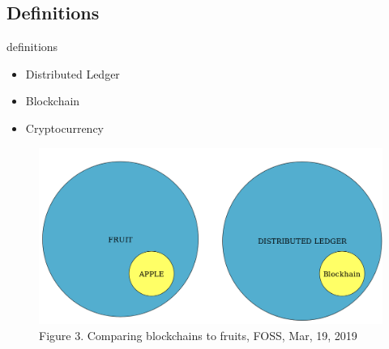 \documentclass[xcolor=x11names,compress]{beamer}
\renewcommand{\(}{\begin{columns}}
\renewcommand{\)}{\end{columns}}
\newcommand{\<}[1]{\begin{column}{#1}}
\renewcommand{\>}{\end{column}}
\begin{document}
\subsection{Definitions}
\begin{frame}{definitions}
    \begin{itemize}
        \item Distributed Ledger
        \item Blockchain
        \item Cryptocurrency
    \end{itemize}
\end{frame}


\begin{frame}
    \begin{figure}
        \includegraphics[scale=0.2]{./images/compare}
        \caption{\tiny  Figure 3. Comparing blockchains to fruits, FOSS, Mar, 19, 2019}
    \end{figure}
\end{frame}
\end{document}

